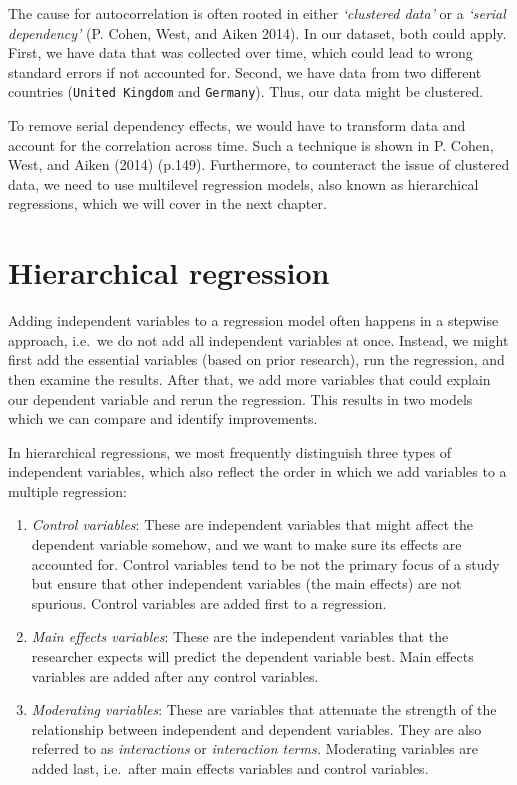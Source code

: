 \documentclass[
  letterpaper,
]{krantz}
\begin{document}
The cause for autocorrelation is often rooted in either \emph{`clustered
data'} or a \emph{`serial dependency'} (P. Cohen, West, and Aiken 2014).
In our dataset, both could apply. First, we have data that was collected
over time, which could lead to wrong standard errors if not accounted
for. Second, we have data from two different countries
(\texttt{United\ Kingdom} and \texttt{Germany}). Thus, our data might be
clustered.

To remove serial dependency effects, we would have to transform data and
account for the correlation across time. Such a technique is shown in P.
Cohen, West, and Aiken (2014) (p.149). Furthermore, to counteract the
issue of clustered data, we need to use multilevel regression models,
also known as hierarchical regressions, which we will cover in the next
chapter.

\section{Hierarchical regression}\label{sec-hierarchical-regression}

Adding independent variables to a regression model often happens in a
stepwise approach, i.e.~we do not add all independent variables at once.
Instead, we might first add the essential variables (based on prior
research), run the regression, and then examine the results. After that,
we add more variables that could explain our dependent variable and
rerun the regression. This results in two models which we can compare
and identify improvements.

In hierarchical regressions, we most frequently distinguish three types
of independent variables, which also reflect the order in which we add
variables to a multiple regression:

\begin{enumerate}
\def\labelenumi{\arabic{enumi}.}
\item
  \emph{Control variables}: These are independent variables that might
  affect the dependent variable somehow, and we want to make sure its
  effects are accounted for. Control variables tend to be not the
  primary focus of a study but ensure that other independent variables
  (the main effects) are not spurious. Control variables are added first
  to a regression.
\item
  \emph{Main effects variables}: These are the independent variables
  that the researcher expects will predict the dependent variable best.
  Main effects variables are added after any control variables.
\item
  \emph{Moderating variables}: These are variables that attenuate the
  strength of the relationship between independent and dependent
  variables. They are also referred to as \emph{interactions} or
  \emph{interaction terms.} Moderating variables are added last,
  i.e.~after main effects variables and control variables.
\end{enumerate}
\end{document}
